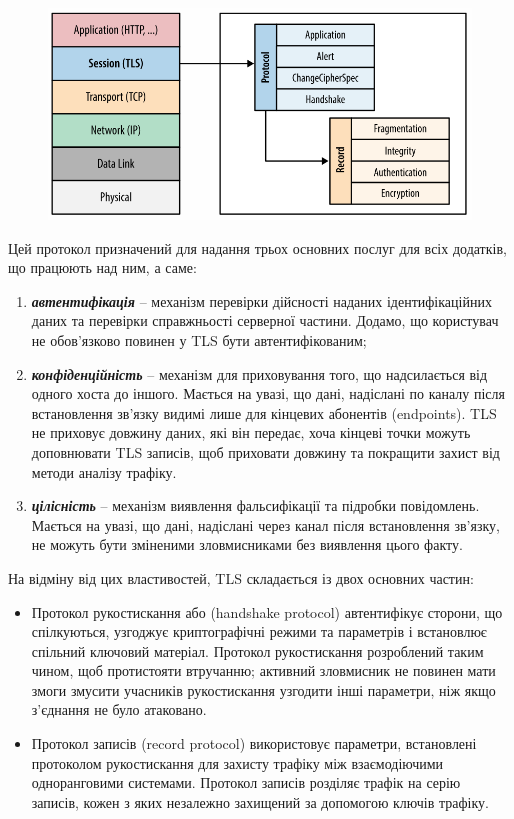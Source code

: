 \begin{figure}[ht]
        \centering
        \includegraphics[scale=0.35]{../IMAGES/tls_oreally.png}
        \label{tls_oreally}
\end{figure}

Цей протокол призначений для надання трьох основних послуг для всіх додатків, що працюють над ним, а саме:
\begin{enumerate}
    \item \textbf{\textit{автентифікація}} -- механізм перевірки дійсності наданих ідентифікаційних даних та перевірки справжньості серверної частини. Додамо, що користувач не обов'язково повинен у TLS бути автентифікованим;
    \item \textbf{\textit{конфіденційність}} -- механізм для приховування того, що надсилається від одного хоста до іншого. Мається на увазі, що дані, надіслані по каналу після встановлення зв'язку видимі лише для кінцевих абонентів (endpoints). TLS не приховує довжину даних, які він передає, хоча кінцеві точки можуть доповнювати TLS записів, щоб приховати довжину та покращити захист від методи аналізу трафіку.
    \item \textbf{\textit{цілісність}} -- механізм виявлення фальсифікації та підробки повідомлень. Мається на увазі, що дані, надіслані через канал після встановлення зв'язку, не можуть бути зміненими зловмисниками без виявлення цього факту.
\end{enumerate}

На відміну від цих властивостей, TLS складається із двох основних частин: 

\begin{itemize}
    \item Протокол рукостискання або (handshake protocol) автентифікує сторони, що спілкуються, узгоджує криптографічні режими та параметрів і встановлює спільний ключовий матеріал. Протокол рукостискання розроблений таким чином, щоб протистояти втручанню; активний зловмисник не повинен мати змоги змусити учасників рукостискання узгодити інші параметри, ніж якщо з'єднання не було атаковано.
    \item Протокол записів (record protocol) використовує параметри, встановлені протоколом рукостискання для захисту трафіку між взаємодіючими одноранговими системами. Протокол записів розділяє трафік на серію записів, кожен з яких незалежно захищений за допомогою ключів трафіку.
\end{itemize}

